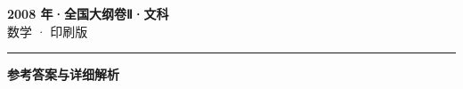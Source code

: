\documentclass[zihao=5, a4paper]{ctexart}
\begin{document}
\begin{center}
  {\Large\bfseries 2008 年·全国大纲卷Ⅱ·文科}\\[4pt]
  {\large 数学 · 印刷版}
\end{center}
\medskip
{}

\par\bigskip\hrule\bigskip
{}
\begin{center}{\large\bfseries 参考答案与详细解析}\end{center}
\smallskip

\end{document}
